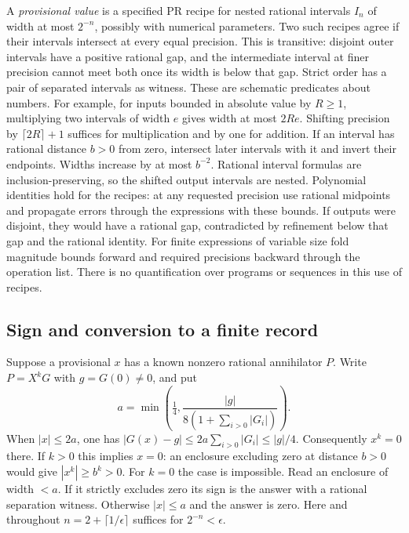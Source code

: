 A \emph{provisional value} is a specified PR recipe for nested rational
intervals $I_n$ of width at most $2^{-n}$, possibly with numerical
parameters. Two such recipes agree if their intervals intersect at
every equal precision. This is transitive: disjoint outer intervals have
a positive rational gap, and the intermediate interval at finer precision
cannot meet both once its width is below that gap. Strict order has a pair of separated intervals
as witness. These are schematic predicates about numbers. For example,
for inputs bounded in absolute value by $R\ge1$, multiplying two
intervals of width $e$ gives width at most $2Re$. Shifting precision
by $\lceil 2R\rceil+1$ suffices for multiplication and by one for
addition. If an interval has rational distance $b>0$ from zero, intersect
later intervals with it and invert their endpoints. Widths increase by
at most $b^{-2}$. Rational interval formulas are inclusion-preserving,
so the shifted output intervals are nested. Polynomial identities hold
for the recipes: at any requested precision use rational midpoints and
propagate errors through the expressions with these bounds. If outputs
were disjoint, they would have a rational gap, contradicted by refinement
below that gap and the rational identity. For finite expressions of
variable size fold magnitude bounds forward and required precisions
backward through the operation list. There is no quantification over
programs or sequences in this use of recipes.

\subsection{Sign and conversion to a finite record}
Suppose a provisional $x$ has a known nonzero rational annihilator $P$.
Write $P=X^k G$ with $g=G(0)\ne0$, and put
\[
 a=\min\left(\tfrac14,\frac{|g|}{8(1+\sum_{i>0}|G_i|)}\right).
\]
When $|x|\le2a$, one has $|G(x)-g|\le2a\sum_{i>0}|G_i|\le|g|/4$.
Consequently $x^k=0$ there. If $k>0$ this implies $x=0$: an enclosure
excluding zero at distance $b>0$ would give $|x^k|\ge b^k>0$.
For $k=0$ the case is impossible. Read an enclosure of width $<a$.
If it strictly excludes zero its sign is the answer with a rational
separation witness. Otherwise $|x|\le a$ and the answer is zero.
Here and throughout $n=2+\lceil1/\epsilon\rceil$ suffices for
$2^{-n}<\epsilon$.

